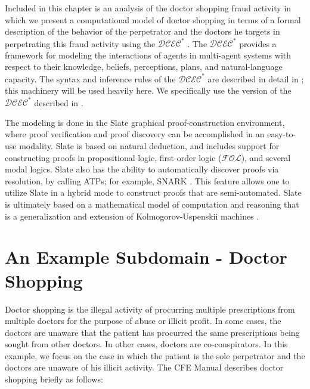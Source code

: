 Included in this chapter is an analysis of the doctor shopping fraud activity in which we present a computational model of doctor shopping in terms of a formal description of the behavior of the perpetrator and the doctors he targets in perpetrating this fraud activity using the $\mathcal{DCEC}^\ast$ \cite{mgmmm_ptai_sb,ka_sb_scc_seqcalc}.  The $\mathcal{DCEC}^\ast$ provides a framework for modeling the interactions of agents in multi-agent systems with respect to their knowledge, beliefs, perceptions, plans, and natural-language capacity.  The syntax and inference rules of the $\mathcal{DCEC}^\ast$ are described in detail in \cite{mgmmm_ptai_sb,ka_sb_scc_seqcalc}; this machinery will be used heavily here.  We specifically use the version of the $\mathcal{DCEC}^\ast$ described in \cite{ka_sb_scc_seqcalc}.

The modeling is done in the Slate \cite{Slate_at_CMNA08} graphical proof-construction environment, where proof verification and proof discovery can be accomplished in an easy-to-use modality.  Slate is based on natural deduction, and includes support for constructing proofs in propositional logic, first-order logic ($\mathcal{FOL}$), and several modal logics.  Slate also has the ability to automatically discover proofs via resolution, by calling ATPs; for example, SNARK \cite{snarksri}.  This feature allows one to utilize Slate in a hybrid mode to construct proofs that are semi-automated.  Slate is ultimately based on a mathematical model of computation and reasoning that is a generalization and extension of Kolmogorov-Uspenskii machines \cite{kolmogorov1958definition,bringsjord_sundar_g_unprov_ct}.


\section{An Example Subdomain - Doctor Shopping}

Doctor shopping is the illegal activity of procurring multiple prescriptions from multiple doctors for the purpose of abuse or illicit profit.  In some cases, the doctors are unaware that the patient has procurred the same prescriptions being sought from other doctors.  In other cases, doctors are co-conspirators.  In this example, we focus on the case in which the patient is the sole perpetrator and the doctors are unaware of his illicit activity.  The CFE Manual describes doctor shopping briefly as follows:

